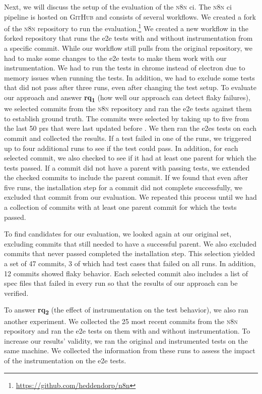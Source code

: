 Next, we will discuss the setup of the evaluation of the \textsc{n8n} \ac{ci}.
The \textsc{n8n} \ac{ci} pipeline is hosted on \textsc{GitHub} and consists of several workflows.
We created a fork of the \textsc{n8n} repository to run the evaluation.\footnote{\url{https://github.com/heddendorp/n8n}}
We created a new workflow in the forked repository that runs the \ac{e2e} tests with and without instrumentation from a specific commit.
While our workflow still pulls from the original repository, we had to make some changes to the \ac{e2e} tests to make them work with our instrumentation.
We had to run the tests in chrome instead of electron due to memory issues when running the tests.
In addition, we had to exclude some tests that did not pass after three runs, even after changing the test setup.
To evaluate our approach and answer \textbf{\acs{rq}\textsubscript{1}} (how well our approach can detect flaky failures), we selected commits from the \textsc{n8n} repository and ran the \ac{e2e} tests against them to establish ground truth.
The commits were selected by taking up to five from the last 50 \acp{pr} that were last updated before .
We then ran the \acp{e2e} tests on each commit and collected the results.
If a test failed in one of the runs, we triggered up to four additional runs to see if the test could pass.
In addition, for each selected commit, we also checked to see if it had at least one parent for which the tests passed.
If a commit did not have a parent with passing tests, we extended the checked commits to include the parent commit.
If we found that even after five runs, the installation step for a commit did not complete successfully, we excluded that commit from our evaluation.
We repeated this process until we had a collection of commits with at least one parent commit for which the tests passed.

To find candidates for our evaluation, we looked again at our original set, excluding commits that still needed to have a successful parent.
We also excluded commits that never passed completed the installation step.
This selection yielded a set of 47 commits, 3 of which had test cases that failed on all runs.
In addition, 12 commits showed flaky behavior.
Each selected commit also includes a list of spec files that failed in every run so that the results of our approach can be verified.

To answer \textbf{\acs{rq}\textsubscript{2}} (the effect of instrumentation on the test behavior), we also ran another experiment.
We collected the 25 most recent commits from the \textsc{n8n} repository and ran the \ac{e2e} tests on them with and without instrumentation.
To increase our results' validity, we ran the original and instrumented tests on the same machine.
We collected the information from these runs to assess the impact of the instrumentation on the \ac{e2e} tests.

